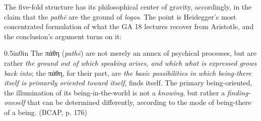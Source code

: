 \documentclass{article}
\newcommand{\gk}[1]{{\greekfont #1}}
\begin{document}
The five-fold structure has its philosophical center of gravity, accordingly, in the claim that the \textit{pathē} are the ground of \textit{logos}. The point is Heidegger's most concentrated formulation of what the GA 18 lectures recover from Aristotle, and the conclusion's argument turns on it:
\begin{adjustwidth}{0.5in}{0in}
The \gk{πάθη} (\textit{pathē}) are not merely an annex of psychical processes, but are rather \textit{the ground out of which speaking arises, and which what is expressed grows back into}; the \gk{πάθη}, for their part, are \textit{the basic possibilities in which being-there itself is primarily oriented toward itself}, finds itself. The primary being-oriented, the illumination of its being-in-the-world is not a \textit{knowing}, but rather a \textit{finding-oneself} that can be determined differently, according to the mode of being-there of a being. (BCAP, p. 176)
\end{adjustwidth}
\end{document}
